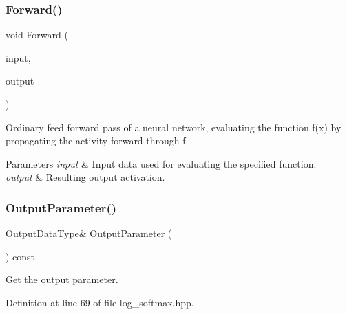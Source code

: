\mbox{\label{classmlpack_1_1ann_1_1LogSoftMax_a09440df0a90bdcc766e56e097d91205b}} 
\subsubsection{Forward()}
{\footnotesize\ttfamily void Forward (\begin{DoxyParamCaption}\item[{const Input\+Type \&}]{input,  }\item[{Output\+Type \&}]{output }\end{DoxyParamCaption})}



Ordinary feed forward pass of a neural network, evaluating the function f(x) by propagating the activity forward through f. 


\begin{DoxyParams}{Parameters}
{\em input} & Input data used for evaluating the specified function. \\
\hline
{\em output} & Resulting output activation. \\
\hline
\end{DoxyParams}
\mbox{\label{classmlpack_1_1ann_1_1LogSoftMax_a8bae962cc603d1cab8d80ec78f8d505d}} 
\subsubsection{Output\+Parameter()\hspace{0.1cm}{\footnotesize\ttfamily [1/2]}}
{\footnotesize\ttfamily Output\+Data\+Type\& Output\+Parameter (\begin{DoxyParamCaption}{ }\end{DoxyParamCaption}) const\hspace{0.3cm}{\ttfamily [inline]}}



Get the output parameter. 



Definition at line 69 of file log\+\_\+softmax.\+hpp.

\mbox{\label{classmlpack_1_1ann_1_1LogSoftMax_a21d5f745f02c709625a4ee0907f004a5}} 
